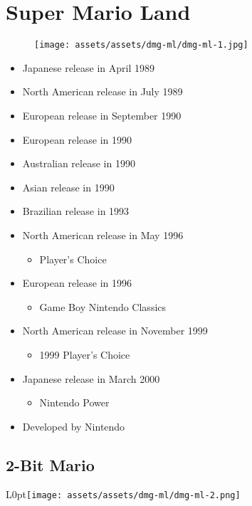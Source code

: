 \documentclass{book}
\begin{document}
\chapter*{Super Mario Land}
\vspace{\baselineskip}\begin{figure}[H]{\texttt{[image: assets/assets/dmg-ml/dmg-ml-1.jpg]}}\end{figure}\vspace{\baselineskip}
\begin{itemize}[left=0pt, nosep]
\item Japanese release in April 1989
\item North American release in July 1989
\item European release in September 1990
\item European release in 1990
\item Australian release in 1990
\item Asian release in 1990
\item Brazilian release in 1993
\item North American release in May 1996
\begin{itemize}
\item Player’s Choice
\end{itemize}
\item European release in 1996
\begin{itemize}
\item Game Boy Nintendo Classics
\end{itemize}
\item North American release in November 1999
\begin{itemize}
\item 1999 Player’s Choice
\end{itemize}
\item Japanese release in March 2000
\begin{itemize}
\item Nintendo Power
\end{itemize}
\item Developed by Nintendo

\end{itemize}
\newpage\FloatBarrier\section*{2-Bit Mario}
\begin{wrapfigure}{L}{0pt}{\texttt{[image: assets/assets/dmg-ml/dmg-ml-2.png]}}\end{wrapfigure}\noindent
\end{document}
